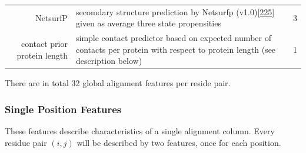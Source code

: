 \documentclass[11pt,a4paper,twoside]{book}
\theoremstyle{definition}
\theoremstyle{definition}
\theoremstyle{remark}
\begin{document}
\begin{longtable}[]{@{}rlc@{}}
\begin{minipage}[t]{0.23\columnwidth}\raggedleft\strut
NetsurfP\strut
\end{minipage} & \begin{minipage}[t]{0.50\columnwidth}\raggedright\strut
secomdary structure prediction by Netsurfp
(v1.0){[}\protect\hyperlink{ref-Petersen2009a}{225}{]} given as average
three state propensities\strut
\end{minipage} & \begin{minipage}[t]{0.18\columnwidth}\centering\strut
3\strut
\end{minipage}\tabularnewline
\begin{minipage}[t]{0.23\columnwidth}\raggedleft\strut
contact prior protein length\strut
\end{minipage} & \begin{minipage}[t]{0.50\columnwidth}\raggedright\strut
simple contact predictor based on expected number of contacts per
protein with respect to protein length (see description below)\strut
\end{minipage} & \begin{minipage}[t]{0.18\columnwidth}\centering\strut
1\strut
\end{minipage}\tabularnewline
\bottomrule
\end{longtable}

There are in total 32 global alignment features per reside pair.

\subsubsection{Single Position Features}\label{seq-features-single}

These features describe characteristics of a single alignment column.
Every residue pair \((i,j)\) will be described by two features, once for
each position.
\end{document}
